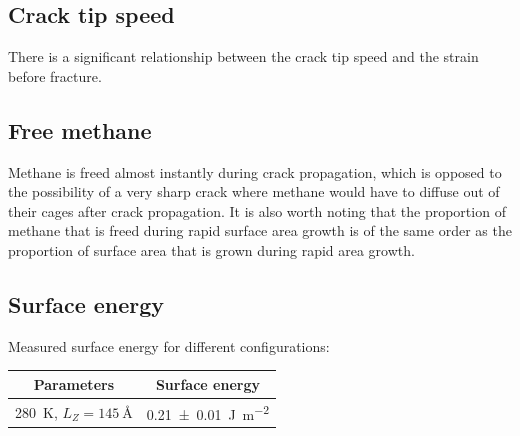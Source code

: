 \subsection{Crack tip speed}
There is a significant relationship between the crack tip speed and the strain before fracture. 

\subsection{Free methane}
Methane is freed almost instantly during crack propagation, which is opposed to the possibility of a very sharp crack where methane would have to diffuse out of their cages after crack propagation. It is also worth noting that the proportion of methane that is freed during rapid surface area growth is of the same order as the proportion of surface area that is grown during rapid area growth.


\subsection{Surface energy}
Measured surface energy for different configurations:

\begin{table}
\centering
\begin{tabular}{c|c}
Parameters & Surface energy \\
\hline
\SI{280}{\kelvin}, $L_Z = \SI{145}{\angstrom}$ & \SI{0.21 \pm 0.01}{\joule\per\meter\squared}
\end{tabular}
\end{table}

